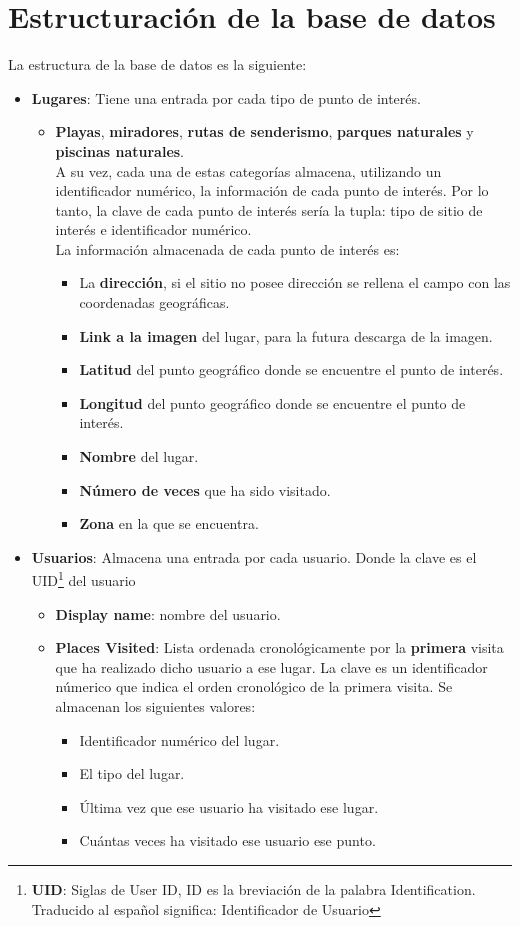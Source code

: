 \documentclass{report}
\begin{document}
\section{Estructuración de la base de datos}
La estructura de la base de datos es la siguiente:
\begin{itemize}
\item \textbf{Lugares}: Tiene una entrada por cada tipo de punto de interés.
\begin{itemize}
\item  \textbf{Playas}, \textbf{miradores}, \textbf{rutas de senderismo}, \textbf{parques naturales} y \textbf{piscinas naturales}.\\ A su vez, cada una de estas categorías almacena, utilizando un identificador numérico, la información de cada punto de interés. Por lo tanto, la clave de cada punto de interés sería la tupla: tipo de sitio de interés e identificador numérico.\\
La información almacenada de cada punto de interés es:
\begin{itemize}
\item La \textbf{dirección}, si el sitio no posee dirección se rellena el campo con las coordenadas geográficas.
\item \textbf{Link a la imagen} del lugar, para la futura descarga de la imagen.
\item \textbf{Latitud} del punto geográfico donde se encuentre el punto de interés.
\item \textbf{Longitud} del punto geográfico donde se encuentre el punto de interés.
\item \textbf{Nombre} del lugar.
\item \textbf{Número de veces} que ha sido visitado.
\item \textbf{Zona} en la que se encuentra.
\end{itemize}
\end{itemize}
\item \textbf{Usuarios}: Almacena una entrada por cada usuario. Donde la clave es el UID\footnote{\textbf{UID}: Siglas de User ID, ID es la breviación de la palabra Identification. Traducido al español significa: Identificador de Usuario} del usuario
\begin{itemize}
\item \textbf{Display name}: nombre del usuario.
\item \textbf{Places Visited}: Lista ordenada cronológicamente por la \textbf{primera} visita que ha realizado dicho usuario a ese lugar. La clave es un identificador númerico que indica el orden cronológico de la primera visita. Se almacenan los siguientes valores:
\begin{itemize}
\item Identificador numérico del lugar.
\item El tipo del lugar.
\item Última vez que ese usuario ha visitado ese lugar.
\item Cuántas veces ha visitado ese usuario ese punto.
\end{itemize}
\end{itemize}
\end{itemize}
\end{document}
